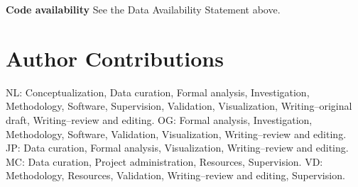 \documentclass[oneside,pdflatex,sn-mathphys-num]{sn-jnl}
\begin{document}
\noindent\textbf{Code availability} See the Data Availability Statement above.

\section*{Author Contributions}

NL: Conceptualization, Data curation, Formal analysis, Investigation, Methodology, Software, Supervision, Validation, Visualization, Writing--original draft, Writing--review and editing. OG: Formal analysis, Investigation, Methodology, Software, Validation, Visualization, Writing--review and editing. JP: Data curation, Formal analysis, Visualization, Writing--review and editing. MC: Data curation, Project administration, Resources, Supervision. VD: Methodology, Resources, Validation, Writing--review and editing, Supervision.


\end{document}

